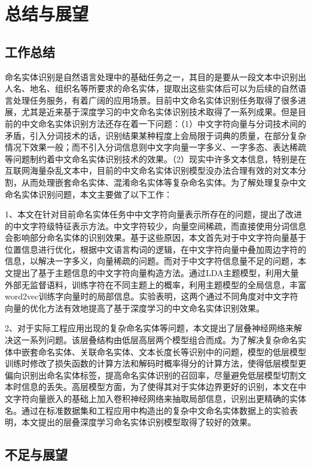 \documentclass[winfonts,master,oneside,nobackinfo]{njuthesis}
\begin{document}
\chapter{总结与展望}

\section{工作总结}

命名实体识别是自然语言处理中的基础任务之一，其目的是要从一段文本中识别出人名、地名、组织名等所要求的命名实体，提取出这些实体后可以为后续的自然语言处理任务服务，有着广阔的应用场景。目前中文命名实体识别任务取得了很多进展，尤其是近来基于深度学习的中文命名实体识别技术取得了一系列成果。但是目前的中文命名实体识别方法还存在着一下问题：（1）中文字符向量与分词技术间的矛盾，引入分词技术的话，识别结果某种程度上会局限于词典的质量，在部分复杂情况下效果一般；而不引入分词信息则中文字向量一字多义、一字多态、表达稀疏等问题制约着中文命名实体识别技术的效果。（2）现实中许多文本信息，特别是在互联网海量杂乱文本中，目前的中文命名实体识别模型没办法合理有效的对文本分割，从而处理嵌套命名实体、混淆命名实体等复杂命名实体。为了解处理复杂中文命名实体识别问题，本文主要做了以下工作：

1、本文在针对目前命名实体任务中中文字符向量表示所存在的问题，提出了改进的中文字符级特征表示方法。中文字符较少，向量空间稀疏，而直接使用分词信息会影响部分命名实体的识别效果。基于这些原因，本文首先对于中文字符向量基于位置信息进行优化，根据中文语言构词的逻辑，在中文字符向量中叠加周边字符的信息，以解决一字多义，向量稀疏的问题。而对于中文字符信息量不足的问题，本文提出了基于主题信息的中文字符向量构造方法。通过LDA主题模型，利用大量外部无监督语料，训练字符在不同主题上的概率，利用主题模型的全局信息，丰富word2vec训练字向量时的局部信息。实验表明，这两个通过不同角度对中文字符向量的优化方法有效地提高了基于深度学习的中文命名实体识别效果。

2、对于实际工程应用出现的复杂命名实体等问题，本文提出了层叠神经网络来解决这一系列问题。该层叠结构由低层高层两个模型组合而成。为了解决复杂命名实体中嵌套命名实体、关联命名实体、文本长度长等识别中的问题，模型的低层模型训练时修改了损失函数的计算方法和解码时概率得分的计算方法，使得低层模型更偏向识别出命名实体标签，提高命名实体识别的召回率，尽量避免低层模型切割文本时信息的丢失。高层模型方面，为了使得其对于实体边界更好的识别，本文在中文字符向量嵌入的基础上加入卷积神经网络来抽取局部信息，识别出更精确的实体名。通过在标准数据集和工程应用中构造出的复杂中文命名实体数据上的实验表明，本文提出的层叠深度学习命名实体识别模型取得了较好的效果。

\section{不足与展望}
\end{document}
